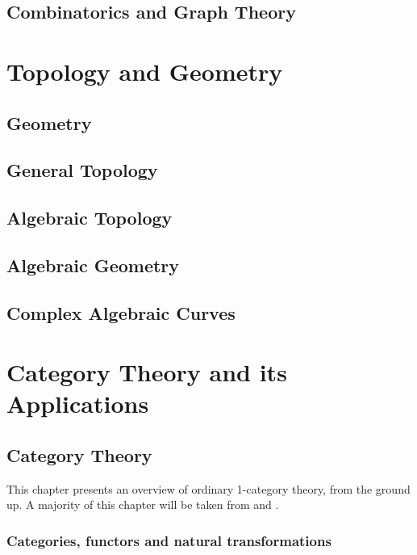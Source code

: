\documentclass[12pt]{report}
\theoremstyle{definition}
\begin{document}
\chapter{Combinatorics and Graph Theory}\label{cha:comb-graph-theory}


\part{Topology and Geometry}

\chapter{Geometry}\label{cha:geometry}

\chapter{General Topology}\label{cha:general-topology}

\chapter{Algebraic Topology}\label{cha:algebraic-topology}

\chapter{Algebraic Geometry}\label{cha:algebraic-geometry}

\chapter{Complex Algebraic Curves}\label{cha:compl-algebr-curv}



\part{Category Theory and its Applications}\label{part:category-theory-its}

\chapter{Category Theory}\label{cha:category-theory}
This chapter presents an overview of ordinary 1-category theory, from the ground up. A majority of this chapter will be taken from \cite{Leinster:Basic_Category_Theory} and \cite{riehl2016category}.

\section{Categories, functors and natural transformations}
\end{document}
